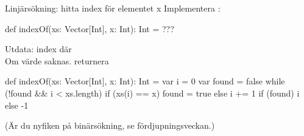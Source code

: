 %

\begin{Slide}{Linjärsökning: hitta index för elementet x}
Implementera :
\begin{Code}
def indexOf(xs: Vector[Int], x: Int): Int = ???
\end{Code}
Utdata: index  där \\Om värde saknas. returnera 
\pause
\begin{Code}
def indexOf(xs: Vector[Int], x: Int): Int = {
  var i = 0
  var found = false
  while (!found && i < xs.length) {
    if (xs(i) == x) found = true
    else i += 1
  }
  if (found) i else -1
}
\end{Code}
(Är du nyfiken på binärsökning, se fördjupningsveckan.)
\end{Slide}

